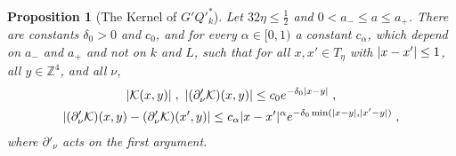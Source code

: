\documentclass[11pt]{preprint}
\DeclarePairedDelimiter{\abs}{\lvert}{\rvert}
\numberwithin{equation}{section}
\newtheorem{proposition}[theorem]{Proposition}
\theoremstyle{definition}
\theoremstyle{remark}
\theoremstyle{plain}
\begin{document}
\begin{proposition}[The Kernel of $G'Q'^*_k$]\label{prop:kernel}
Let $32\eta \leq \frac12$ and $0 < a_- \leq a \leq a_+$. There are constants $\delta_0 > 0$ and $c_0$, and for every $\alpha \in [0, 1)$ a constant $c_\alpha$, which depend on $a_-$ and $a_+$ and not on $k$ and $L$, such that for all $x, x' \in T_\eta$ with $\abs{x - x'} \leq 1$, all $y \in \mathbb Z^4$, and all $\nu$,
\begin{equation}\label{eq:kernel-bounds}
\begin{gathered}
    \abs{\mathcal K(x, y)}\;,\ \abs{(\partial'_\nu\mathcal K)(x, y)} \leq c_0e^{-\delta_0\abs{x - y}}\;,\\
    \abs{(\partial'_\nu\mathcal K)(x, y) - (\partial'_\nu\mathcal K)(x', y)} \leq c_\alpha\abs{x - x'}^\alpha e^{-\delta_0\min(\abs{x - y}, \abs{x' - y})}\;,
\end{gathered}
\end{equation}
where $\partial'_\nu$ acts on the first argument.
\end{proposition}
\end{document}
